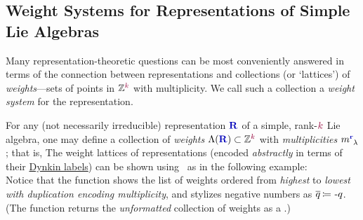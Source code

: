 \documentclass[12pt,a4paper]{article}\let\ifpdf\relax
\begin{document}
\subsection{Weight Systems for Representations of Simple Lie Algebras}\label{weight_lattices_for_reps}\vspace{-4pt}

Many representation-theoretic questions can be most conveniently answered in terms of the connection between representations and collections (or `lattices') of \emph{weights}---sets of points in $\mathbb{Z}^{\r{k}}$ with multiplicity. We call such a collection a \emph{weight system} for the representation. 


For any (not necessarily irreducible) representation $\mathbf{\b{R}}$ of a simple, rank-$\r{k}$ Lie algebra, one may define a collection of \emph{weights} $\Lambda(\mathbf{\b{R}})\subset\mathbb{Z}^{\r{k}}$ with \emph{multiplicities} $m\indices{\mathbf{\b{r}}}{\lambda}$; that is, 
%
%
The weight lattices of representations (encoded \emph{abstractly} in terms of their \hyperlink{label:w}{Dynkin labels}) can be shown using \rpackage~as in the following example:
%
~\\[-4pt]
%
Notice that the function  shows the list of weights ordered from \emph{highest} to \emph{lowest} \emph{with duplication encoding multiplicity}, and stylizes negative numbers as $\bar{q}\equivR\text{-}q$. (The function  returns the \emph{unformatted} collection of weights as a .)\\[-8pt]
\end{document}

